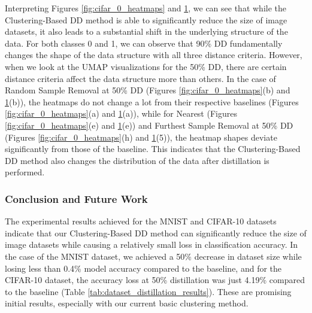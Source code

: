 \begin{figure}[t]
    \label{fig:ALLVITS}
    \label{fig:cifar_1_heatmaps}
\end{figure}

Interpreting Figures \ref{fig:cifar_0_heatmaps} and \ref{fig:cifar_1_heatmaps}, we can see that while the Clustering-Based DD method is able to significantly reduce the size of image datasets, it also leads to a substantial shift in the underlying structure of the data. For both classes 0 and 1, we can observe that 90\% DD fundamentally changes the shape of the data structure with all three distance criteria. However, when we look at the UMAP visualizations for the 50\% DD, there are certain distance criteria affect the data structure more than others. In the case of Random Sample Removal at 50\% DD (Figures \ref{fig:cifar_0_heatmaps}(b) and \ref{fig:cifar_1_heatmaps}(b)), the heatmaps do not change a lot from their respective baselines (Figures \ref{fig:cifar_0_heatmaps}(a) and \ref{fig:cifar_1_heatmaps}(a)), while for Nearest (Figures \ref{fig:cifar_0_heatmaps}(e) and \ref{fig:cifar_1_heatmaps}(e)) and Furthest Sample Removal at 50\% DD (Figures \ref{fig:cifar_0_heatmaps}(h) and \ref{fig:cifar_1_heatmaps}(5)), the heatmap shapes deviate significantly from those of the baseline. This indicates that the Clustering-Based DD method also changes the distribution of the data after distillation is performed.

\subsubsection{Conclusion and Future Work}

The experimental results achieved for the MNIST and CIFAR-10 datasets indicate that our Clustering-Based DD method can significantly reduce the size of image datasets while causing a relatively small loss in classification accuracy. In the case of the MNIST dataset, we achieved a 50\% decrease in dataset size while losing less than 0.4\% model accuracy compared to the baseline, and for the CIFAR-10 dataset, the accuracy loss at 50\% distillation was just 4.19\% compared to the baseline (Table \ref{tab:dataset_distillation_results}). These are promising initial results, especially with our current basic clustering method. 

